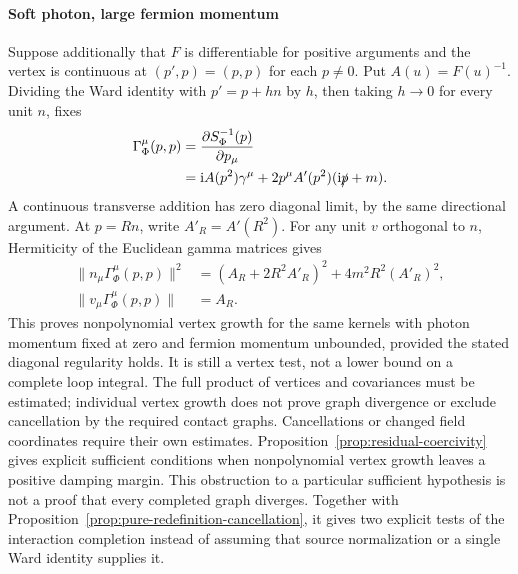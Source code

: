 \documentclass[final,5p,times,twocolumn,numbers,nopreprintline]{elsarticle}
\numberwithin{equation}{section}
\theoremstyle{definition}
\theoremstyle{remark}
\newcommand{\ii}{\mathrm i}
\newcommand{\Ph}{\Phi}
\begin{document}
\paragraph{Soft photon, large fermion momentum}
Suppose additionally that \(F\) is differentiable for positive
arguments and the vertex is continuous at \((p',p)=(p,p)\)
for each \(p\ne0\). Put \(A(u)=F(u)^{-1}\). Dividing the
Ward identity with \(p'=p+hn\) by \(h\), then taking
\(h\to0\) for every unit \(n\), fixes
\begin{equation}
\begin{aligned}
 \Gamma_\Ph^\mu(p,p)
 &=\frac{\partial S_\Ph^{-1}(p)}{\partial p_\mu}\\
 &=\ii A(p^2)\gamma^\mu
    +2p^\mu A'(p^2)(\ii\slashed p+m).
\end{aligned}
 \label{eq:soft-Ward-vertex}
\end{equation}
A continuous transverse addition has zero diagonal limit, by the
same directional argument. At \(p=Rn\), write \(A'_R=A'(R^2)\).
For any unit \(v\) orthogonal to \(n\), Hermiticity of the
Euclidean gamma matrices gives
\begin{equation}
\begin{aligned}
 \|n_\mu\Gamma_\Ph^\mu(p,p)\|^2
   &=(A_R+2R^2A'_R)^2+4m^2R^2(A'_R)^2,\\
 \|v_\mu\Gamma_\Ph^\mu(p,p)\|&=A_R.
\end{aligned}
 \label{eq:soft-Ward-norms}
\end{equation}
This proves nonpolynomial vertex growth for the same kernels with
photon momentum fixed at zero and fermion momentum unbounded,
provided the stated diagonal regularity holds. It is still a
vertex test, not a lower bound on a complete loop integral.
The full product of vertices and covariances must be estimated;
individual vertex growth does not prove graph divergence or exclude
cancellation by the required contact graphs. Cancellations or changed
field coordinates require their own estimates.
Proposition~\ref{prop:residual-coercivity} gives explicit sufficient
conditions when nonpolynomial vertex growth leaves a positive damping
margin. This obstruction to a particular sufficient hypothesis is not a proof
that every completed graph diverges. Together with
Proposition~\ref{prop:pure-redefinition-cancellation}, it gives two
explicit tests of the interaction completion instead of assuming
that source normalization or a single Ward identity supplies it.
\end{document}
